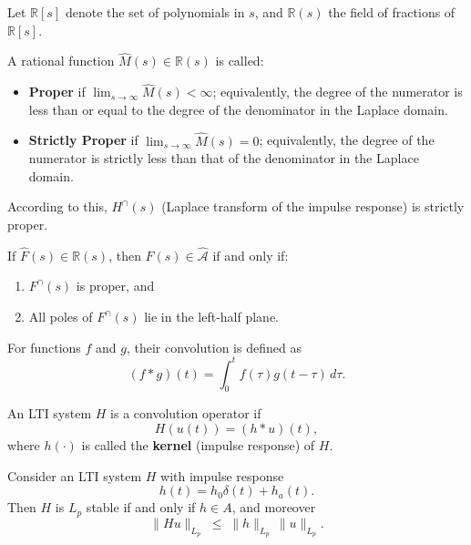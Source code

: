 \begin{definition}  
Let $\mathbb{R}[s]$ denote the set of polynomials in $s$, and $\mathbb{R}(s)$ the field of fractions of $\mathbb{R}[s]$.  

A rational function $\hat{M}(s) \in \mathbb{R}(s)$ is called:  
\begin{itemize}
    \item \textbf{Proper} if $\displaystyle \lim_{s \to \infty} \hat{M}(s) < \infty$; equivalently, the degree of the numerator is less than or equal to the degree of the denominator in the Laplace domain.
    \item \textbf{Strictly Proper} if $\displaystyle \lim_{s \to \infty} \hat{M}(s) = 0$; equivalently, the degree of the numerator is strictly less than that of the denominator in the Laplace domain.
\end{itemize}
According to this, $H^\cap(s)$ (Laplace transform of the impulse response) is strictly proper.
\end{definition}

\begin{theorem}  
If $\hat{F}(s) \in \mathbb{R}(s)$, then $F(s) \in \hat{\mathcal{A}}$ if and only if:
\begin{enumerate}
    \item $F^\cap(s)$ is proper, and  
    \item All poles of $F^\cap(s)$ lie in the left-half plane.  
\end{enumerate}
\end{theorem}

\begin{definition}[Convolution]  
For functions $f$ and $g$, their convolution is defined as
\begin{equation}
(f * g)(t) = \int_0^t f(\tau) g(t-\tau)\, d\tau.
\end{equation}
\end{definition}

\begin{definition}  
An LTI system $H$ is a convolution operator if
\begin{equation}
H(u(t)) = (h * u)(t),
\end{equation}
where $h(\cdot)$ is called the \textbf{kernel} (impulse response) of $H$.  
\end{definition}

\begin{theorem}[Lp Stability]  
Consider an LTI system $H$ with impulse response
\begin{equation}
h(t) = h_0 \delta(t) + h_a(t).
\end{equation}
Then $H$ is $L_p$ stable if and only if $h \in A$, and moreover
\begin{equation}
\|Hu\|_{L_p} \;\leq\; \|h\|_{L_p}\, \|u\|_{L_p}.
\end{equation}
\end{theorem}

